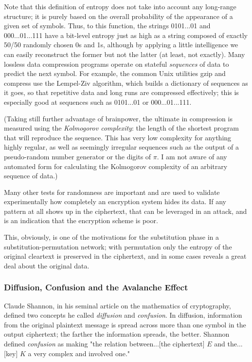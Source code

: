\documentclass[%
 aip,
 jmp,%
 amsmath,amssymb,
 reprint,%
]{revtex4-1}
\begin{document}
Note that this definition of entropy does not take into account any
long-range structure; it is purely based on the overall probability of
the appearance of a given set of symbols.  Thus, to this function, the
strings 0101...01 and 000...01...111 have a bit-level entropy just as
high as a string composed of exactly 50/50 randomly chosen 0s and 1s,
although by applying a little intelligence we can easily reconstruct
the former but not the latter (at least, not exactly).  Many lossless
data compression programs operate on stateful \emph{sequences} of data to
predict the next symbol.  For example, the common Unix utilities gzip
and compress use the Lempel-Ziv algorithm, which builds a dictionary
of sequences as it goes, so that repetitive data and long runs are
compressed effectively; this is especially good at sequences such as
0101...01 or 000...01...111.

(Taking still further advantage of brainpower, the ultimate in
compression is measured using the \emph{Kolmogorov complexity}: the length
of the shortest program that will reproduce the sequence.  This has
very low complexity for anything highly regular, as well as seemingly
irregular sequences such as the output of a pseudo-random number
generator or the digits of $\pi$.  I am not aware of any automated
form for calculating the Kolmogorov complexity of an arbitrary
sequence of data.)

Many other tests for randomness are important and are used to validate
experimentally how completely an encryption system hides its data.  If
any pattern at all shows up in the ciphertext, that can be leveraged
in an attack, and is an indication that the encryption scheme is
poor.

This, obviously, is one of the motivations for the substitution phase
in a substitution-permutation network; with permutation only the
entropy of the original cleartext is preserved in the ciphertext, and
in some cases reveals a great deal about the original data.

\subsubsection{Diffusion, Confusion and the Avalanche Effect}

Claude Shannon, in his seminal article on the mathematics of
cryptography, defined two concepts he called \emph{diffusion} and
\emph{confusion}.  In diffusion, information from the original plaintext
message is spread across more than one symbol in the output
ciphertext; the farther the information spreads, the better.  Shannon
defined \emph{confusion} as making "the relation between...[the ciphertext]
$E$ and the...[key] $K$ a very complex and involved one."
\end{document}
